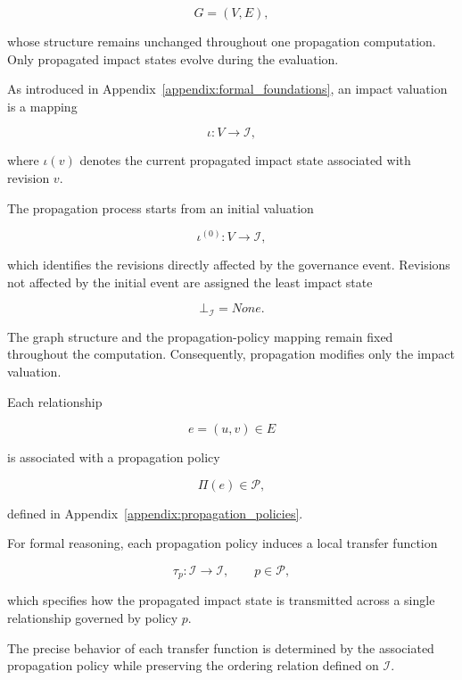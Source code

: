 \documentclass[10pt]{article}
\begin{document}
\[
G=(V,E),
\]

whose structure remains unchanged throughout one propagation computation. Only propagated impact states evolve during the evaluation.

As introduced in Appendix~\ref{appendix:formal_foundations}, an impact valuation
is a mapping

\[
\iota : V \rightarrow \mathcal{I},
\]

where $\iota(v)$ denotes the current propagated impact state associated with
revision $v$.

The propagation process starts from an initial valuation

\begin{equation}
	\iota^{(0)} : V \rightarrow \mathcal{I},
	\label{eq:initial_impact_valuation}
\end{equation}

which identifies the revisions directly affected by the governance event.
Revisions not affected by the initial event are assigned the least impact state

\[
\bot_{\mathcal I}=None.
\]

The graph structure and the propagation-policy mapping remain fixed throughout the computation. Consequently, propagation modifies only the impact valuation.


Each relationship

\[
e=(u,v)\in E
\]

is associated with a propagation policy

\[
\Pi(e)\in\mathcal P,
\]

defined in Appendix~\ref{appendix:propagation_policies}.

For formal reasoning, each propagation policy induces a local transfer function

\begin{equation}
	\tau_p :
	\mathcal I
	\rightarrow
	\mathcal I,
	\qquad
	p\in\mathcal P,
	\label{eq:transfer_function}
\end{equation}

which specifies how the propagated impact state is transmitted across a single relationship governed by policy $p$.

The precise behavior of each transfer function is determined by the associated propagation policy while preserving the ordering relation defined on
$\mathcal I$.
\end{document}
